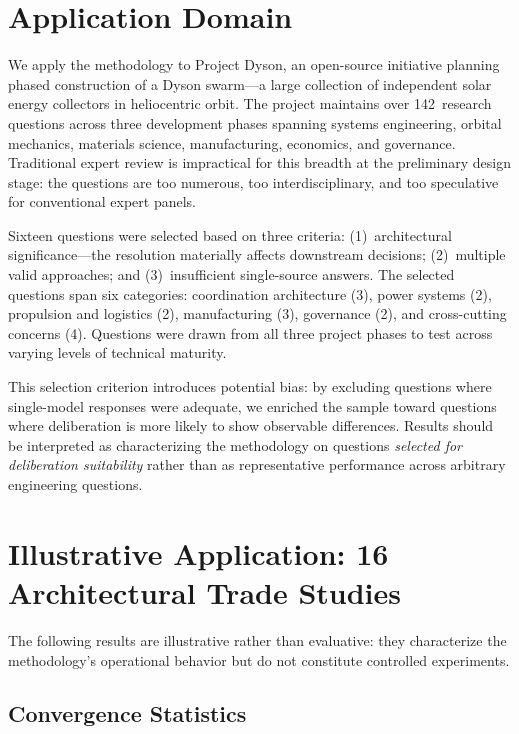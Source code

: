\documentclass[11pt,a4paper]{article}
\begin{document}
\section{Application Domain}
\label{sec:domain}

We apply the methodology to Project Dyson, an open-source initiative planning phased construction of a Dyson swarm---a large collection of independent solar energy collectors in heliocentric orbit. The project maintains over 142~research questions across three development phases spanning systems engineering, orbital mechanics, materials science, manufacturing, economics, and governance. Traditional expert review is impractical for this breadth at the preliminary design stage: the questions are too numerous, too interdisciplinary, and too speculative for conventional expert panels.

Sixteen questions were selected based on three criteria: (1)~architectural significance---the resolution materially affects downstream decisions; (2)~multiple valid approaches; and (3)~insufficient single-source answers. The selected questions span six categories: coordination architecture (3), power systems (2), propulsion and logistics (2), manufacturing (3), governance (2), and cross-cutting concerns (4). Questions were drawn from all three project phases to test across varying levels of technical maturity.

This selection criterion introduces potential bias: by excluding questions where single-model responses were adequate, we enriched the sample toward questions where deliberation is more likely to show observable differences. Results should be interpreted as characterizing the methodology on questions \emph{selected for deliberation suitability} rather than as representative performance across arbitrary engineering questions.

\section{Illustrative Application: 16 Architectural Trade Studies}
\label{sec:results}

The following results are illustrative rather than evaluative: they characterize the methodology's operational behavior but do not constitute controlled experiments.

\subsection{Convergence Statistics}
\end{document}
